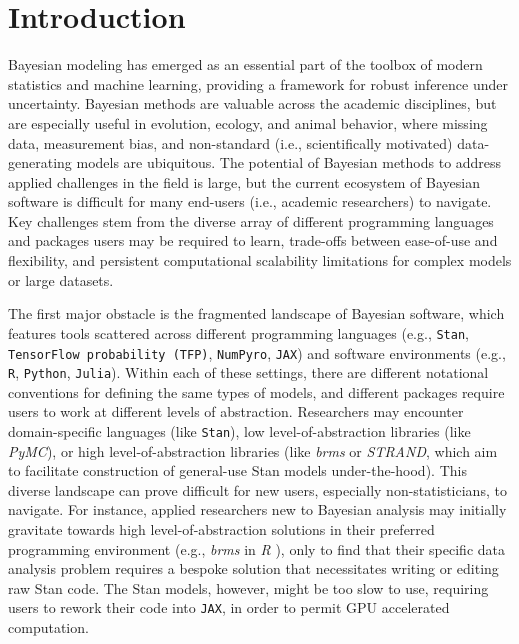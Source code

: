 \documentclass[num-refs]{wiley-article}
\begin{document}
\section{Introduction}\label{introduction}

Bayesian modeling has emerged as an essential part of the toolbox of modern statistics and machine learning, providing a framework for robust inference under uncertainty. Bayesian methods are valuable across the academic disciplines, but are especially useful in evolution, ecology, and animal behavior, where missing data, measurement bias, and non-standard (i.e., scientifically motivated) data-generating models are ubiquitous. The potential of Bayesian methods to address applied challenges in the field is large, but the current ecosystem of Bayesian software is difficult for many end-users (i.e., academic researchers) to navigate. Key challenges stem from the diverse array of different programming languages and packages users may be required to learn, trade-offs between ease-of-use and flexibility, and persistent computational scalability limitations for complex models or large datasets.


The first major obstacle is the fragmented landscape of Bayesian software, which features tools scattered across different programming languages (e.g., \texttt{Stan}, \texttt{TensorFlow probability (TFP)}, \texttt{NumPyro}, \texttt{JAX}) and software environments (e.g., \texttt{R}, \texttt{Python}, \texttt{Julia}). Within each of these settings, there are different notational conventions for defining the same types of models, and different packages require users to work at different levels of abstraction. Researchers may encounter domain-specific languages (like \texttt{Stan}), low level-of-abstraction libraries (like \textit{PyMC}), or high level-of-abstraction libraries (like \textit{brms} or \textit{STRAND}, which aim to facilitate construction of general-use Stan models under-the-hood). This diverse landscape can prove difficult for new users, especially non-statisticians, to navigate. For instance, applied researchers new to Bayesian analysis may initially gravitate towards high level-of-abstraction solutions in their preferred programming environment (e.g., \textit{brms} \citep{BRMS} in \textit{R} \citep{R}), only to find that their specific data analysis problem requires a bespoke solution that necessitates writing or editing raw Stan code. The Stan models, however, might be too slow to use, requiring users to rework their code into \texttt{JAX}, in order to permit GPU accelerated computation.
\end{document}
